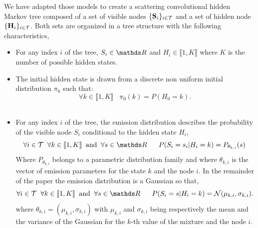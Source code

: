 \documentclass[a4paper,11pt]{report}
\begin{document}
	  We have adapted those models to create a scattering convolutional hidden Markov tree composed of a set of visible nodes $\{{\bf S}_{i}\}_{i \in \mathcal{T}}$ and a set of hidden node $\{{\bf H}_{i}\}_{i \in \mathcal{T}}$. Both sets are organized in a tree structure with the following characteristics,\\
	  
    \begin{itemize}
      \item For any index $i$ of the tree, $S_{i} \in \dsR$ and $H_{i} \in \llbracket 1,K \rrbracket$ where $K$ is the number of possible hidden states.\\
      
      \item The initial hidden state is drawn from a discrete non uniform initial distribution $\pi_{0}$ such that:
	  	  \begin{equation}
					\forall k \in \llbracket 1,K \rrbracket \;\;\; \pi_{0}(k) = P(H_{0}=k).
					\label{eq:SCHMT - initial distribution}
				\end{equation}\\
				
      \item For any index $i$ of the tree, the emission distribution describes the probability of the visible node $S_{i}$ conditional to the hidden state $H_{i}$,
				\begin{equation}
				  \forall i \in \mcalT \;\; \forall k \in \llbracket1,K\rrbracket \;\; \text{and} \;\; \forall s \in \dsR
					\;\;\;\;\;\; P(S_{i}=s_{i}|H_{i}=k) = P_{\theta_{k,i}}(s)
					\label{eq:SCHMT - Emission distr}
				\end{equation}
				Where $P_{\theta_{k,i}}$ belongs to a parametric distribution family and where $\theta_{k,i}$ is the vector of emission parameters for the state $k$ and the node $i$. In the remainder of the paper the emission distribution is a Gaussian so that,  
      	\begin{equation}
				  \forall i \in \mcalT \;\; \forall k \in \llbracket1,K\rrbracket \;\; \text{and} \;\; \forall s \in \dsR
					\;\;\;\;\;\; P(S_{i}=s | H_{i}=k) = \mcalN(\mu_{k,i},\sigma_{k,i}).
				  \label{eq:SCHMT - Mixt of Gaussian}
				\end{equation}
				where $\theta_{k,i}=(\mu_{k,i},\sigma_{k,i})$ with $\mu_{k,i}$ and $\sigma_{k,i}$ being respectively the mean and the variance of the Gaussian for the $k$-th value of the mixture and the node $i$.\\
				

\end{itemize}
\end{document}
